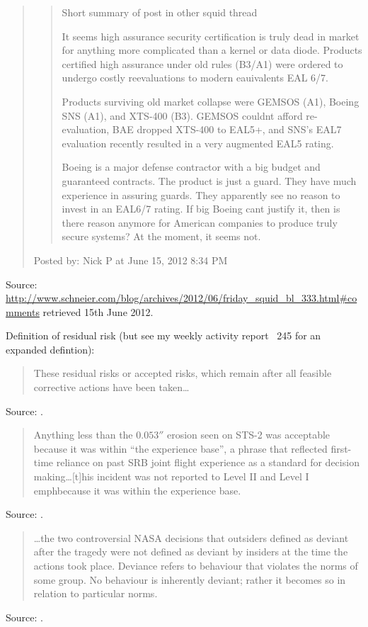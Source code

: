 \documentclass[a4paper]{article}
\begin{document}
\begin{quote}
\begin{quotation}
Short summary of post in other squid thread

It seems high assurance security certification is truly dead in market for anything more
complicated than a kernel or data diode. Products certified high assurance under old rules (B3/A1)
were ordered to undergo costly reevaluations to modern eauivalents EAL 6/7.

Products surviving old market collapse were GEMSOS (A1), Boeing SNS (A1), and XTS-400 (B3). GEMSOS
couldnt afford re-evaluation, BAE dropped XTS-400 to EAL5+, and SNS's EAL7 evaluation recently
resulted in a very augmented EAL5 rating.

Boeing is a major defense contractor with a big budget and guaranteed contracts. The product is
just a guard. They have much experience in assuring guards. They apparently see no reason to invest
in an EAL6/7 rating. If big Boeing cant justify it, then is there reason anymore for American
companies to produce truly secure systems? At the moment, it seems not.
\end{quotation}

Posted by: Nick P at June 15, 2012 8:34 PM
\end{quote}
Source: \url{http://www.schneier.com/blog/archives/2012/06/friday_squid_bl_333.html#comments}
retrieved 15th June 2012.
\medskip

Definition of residual risk (but see my weekly activity report \textnumero~245 for an expanded
defintion):
\begin{quote}
	These residual risks or accepted risks, which remain after all feasible corrective actions have
been taken\ldots
\end{quote}
Source: \cite[p.~82]{Vaughan1996}.
\medskip

\begin{quote}
	Anything less than the $0.053''$ erosion seen on STS-2 was acceptable because it was within
``the experience base'', a phrase that reflected first-time reliance on past SRB joint flight
experience as a standard for decision making\ldots[t]his incident was not reported to Level II and
Level I emph{because} it was within the experience base.
\end{quote}
Source: \cite[p.~136, emphasis in original]{Vaughan1996}.
\medskip

\begin{quote}
	\ldots the two controversial NASA decisions that outsiders defined as deviant after the tragedy
were not defined as deviant by insiders at the time the actions took place.  Deviance refers to
behaviour that violates the norms of some group.  No behaviour is inherently deviant; rather it
becomes so in relation to particular norms.
\end{quote}
Source: \cite[p.~58]{Vaughan1996}.
\medskip
\end{document}
